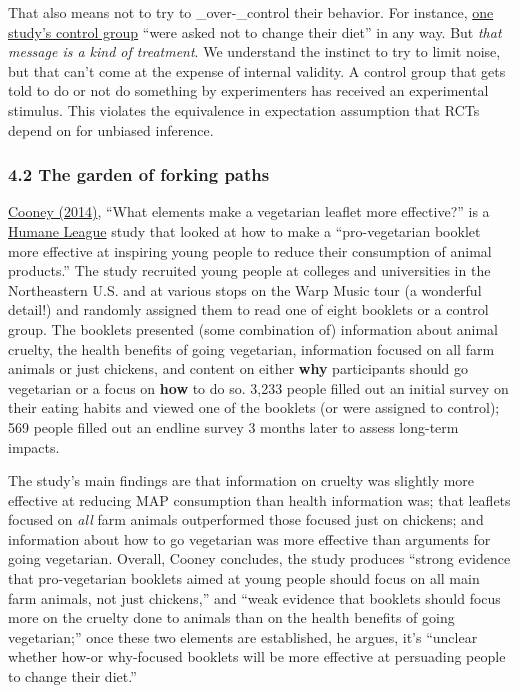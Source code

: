 \documentclass[
  letterpaper,
  DIV=11,
  numbers=noendperiod]{scrartcl}
\begin{document}
That also means not to try to \_over-\_control their behavior. For
instance,
\href{https://www.frontiersin.org/articles/10.3389/fpsyg.2020.577111}{one
study's control group} ``were asked not to change their diet'' in any
way. But \emph{that message is a kind of treatment}. We understand the
instinct to try to limit noise, but that can't come at the expense of
internal validity. A control group that gets told to do or not do
something by experimenters has received an experimental stimulus. This
violates the equivalence in expectation assumption that RCTs depend on
for unbiased inference.

\subsubsection{4.2 The garden of forking
paths}\label{the-garden-of-forking-paths}

\href{https://osf.io/nwcgf}{Cooney (2014)}, ``What elements make a
vegetarian leaflet more effective?'' is a
\href{https://forum.effectivealtruism.org/topics/the-humane-league}{Humane
League} study that looked at how to make a ``pro-vegetarian booklet more
effective at inspiring young people to reduce their consumption of
animal products.'' The study recruited young people at colleges and
universities in the Northeastern U.S. and at various stops on the Warp
Music tour (a wonderful detail!) and randomly assigned them to read one
of eight booklets or a control group. The booklets presented (some
combination of) information about animal cruelty, the health benefits of
going vegetarian, information focused on all farm animals or just
chickens, and content on either \textbf{why} participants should go
vegetarian or a focus on \textbf{how} to do so. 3,233 people filled out
an initial survey on their eating habits and viewed one of the booklets
(or were assigned to control); 569 people filled out an endline survey 3
months later to assess long-term impacts.

The study's main findings are that information on cruelty was slightly
more effective at reducing MAP consumption than health information was;
that leaflets focused on \emph{all} farm animals outperformed those
focused just on chickens; and information about how to go vegetarian was
more effective than arguments for going vegetarian. Overall, Cooney
concludes, the study produces ``strong evidence that pro-vegetarian
booklets aimed at young people should focus on all main farm animals,
not just chickens,'' and ``weak evidence that booklets should focus more
on the cruelty done to animals than on the health benefits of going
vegetarian;'' once these two elements are established, he argues, it's
``unclear whether how-or why-focused booklets will be more effective at
persuading people to change their diet.''
\end{document}
